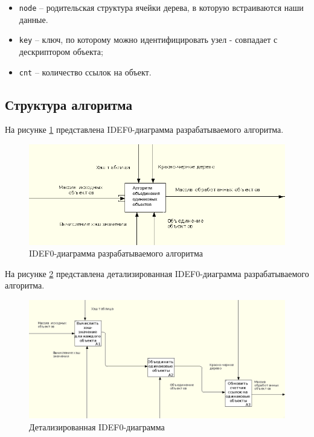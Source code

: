 
\begin{itemize}
	\item \texttt{node} -- родительская структура ячейки дерева, в которую встраиваются наши данные.
	\item \texttt{key} -- ключ, по которому можно идентифицировать узел - совпадает с дескриптором объекта;
	\item \texttt{cnt} -- количество ссылок на объект.
\end{itemize}

\subsection{Структура алгоритма}

На рисунке \ref{fig:idef0-0} представлена IDEF0-диаграмма разрабатываемого алгоритма.

\begin{figure}[h]
	\centering
	\includegraphics[width=\textwidth]{img/idef0-0.png}
	\caption{IDEF0-диаграмма разрабатываемого алгоритма}
	\label{fig:idef0-0}
\end{figure}

На рисунке \ref{fig:idef0-1} представлена детализированная IDEF0-диаграмма разрабатываемого алгоритма.

\begin{figure}[h]
	\centering
	\includegraphics[width=\textwidth]{img/idef0-1.png}
	\caption{Детализированная IDEF0-диаграмма}
	\label{fig:idef0-1}
\end{figure}

